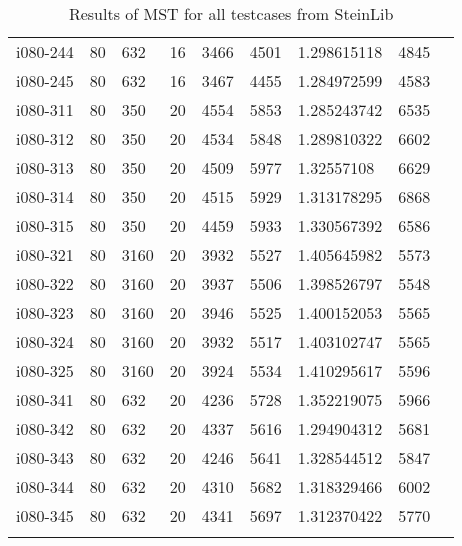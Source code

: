 \begin{appendices}
\begin{longtable}[htbp]{l l l l l l l l l}
 i080-244	&	80 	&	632 	&	16 	&	3466	&	4501	&	1.298615118	&	4845	\\
 i080-245	&	80 	&	632 	&	16 	&	3467	&	4455	&	1.284972599	&	4583	\\
\hline
 i080-311	&	80 	&	350 	&	20 	&	4554	&	5853	&	1.285243742	&	6535	\\
 i080-312	&	80 	&	350 	&	20 	&	4534	&	5848	&	1.289810322	&	6602	\\
 i080-313	&	80 	&	350 	&	20 	&	4509	&	5977	&	1.32557108	&	6629	\\
 i080-314	&	80 	&	350 	&	20 	&	4515	&	5929	&	1.313178295	&	6868	\\
 i080-315	&	80 	&	350 	&	20 	&	4459	&	5933	&	1.330567392	&	6586	\\
\hline
 i080-321	&	80 	&	3160 	&	20 	&	3932	&	5527	&	1.405645982	&	5573	\\
 i080-322	&	80 	&	3160 	&	20 	&	3937	&	5506	&	1.398526797	&	5548	\\
 i080-323	&	80 	&	3160 	&	20 	&	3946	&	5525	&	1.400152053	&	5565	\\
 i080-324	&	80 	&	3160 	&	20 	&	3932	&	5517	&	1.403102747	&	5565	\\
 i080-325	&	80 	&	3160 	&	20 	&	3924	&	5534	&	1.410295617	&	5596	\\
\hline
 i080-341	&	80 	&	632 	&	20 	&	4236	&	5728	&	1.352219075	&	5966	\\
 i080-342	&	80 	&	632 	&	20 	&	4337	&	5616	&	1.294904312	&	5681	\\
 i080-343	&	80 	&	632 	&	20 	&	4246	&	5641	&	1.328544512	&	5847	\\
 i080-344	&	80 	&	632 	&	20 	&	4310	&	5682	&	1.318329466	&	6002	\\
 i080-345	&	80 	&	632 	&	20 	&	4341	&	5697	&	1.312370422	&	5770	\\
\caption{Results of MST for all testcases from SteinLib \cite{Dui93}}\label{tab:MSTFullResults} 	
\end{longtable}

\newpage


\end{appendices}
